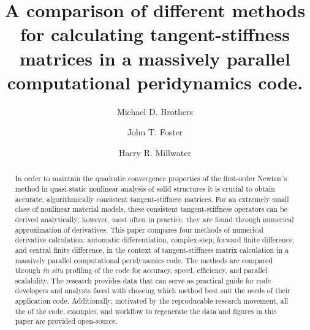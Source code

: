\documentclass[preprint,12pt]{elsarticle}
\begin{document}
\begin{frontmatter}


\author{Michael D. Brothers}
\author{John T. Foster}

\author{Harry R. Millwater\corref{}}
\address{Mechanical Engineering Department, The University of Texas at San Antonio}


\title{A comparison of different methods for calculating tangent-stiffness matrices in a massively parallel computational peridynamics code.}


\begin{abstract} %
In order to maintain the quadratic convergence properties of the first-order Newton's method in quasi-static nonlinear analysis of solid structures it is crucial to obtain accurate, algorithmically consistent tangent-stiffness matrices. For an extremely small class of nonlinear material models, these consistent tangent-stiffness operators can be derived analytically; however, most often in practice, they are found through numerical approximation of derivatives.  This paper compares four methods of numerical derivative calculation: automatic differentiation, complex-step, forward finite difference, and central finite difference, in the context of tangent-stiffness matrix calculation in a massively parallel computational peridynamics code.  The methods are compared through \emph{in situ} profiling of the code for accuracy, speed, efficiency, and parallel scalability.  The research provides data that can serve as practical guide for code developers and analysts faced with choseing which method best suit the needs of their application code.  Additionally, motivated by the reproducable research movement, all the of the code, examples, and workflow to regenerate the data and figures in this paper are provided open-source.
\end{abstract}


\end{frontmatter}
\end{document}
